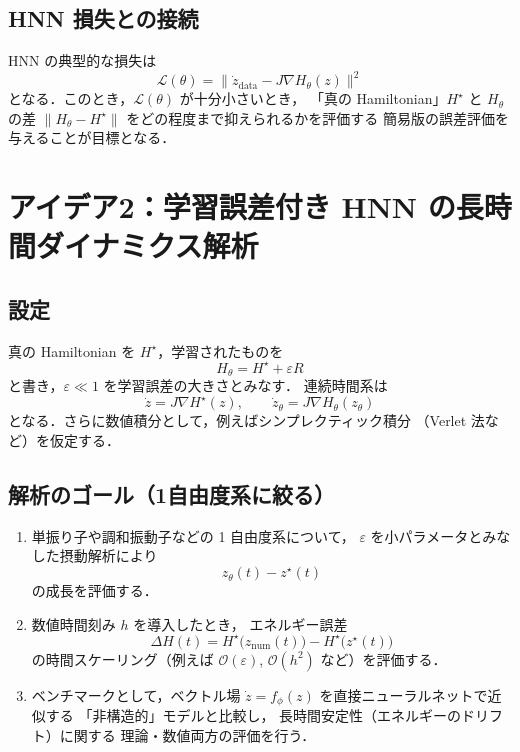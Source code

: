 \documentclass[a4paper,12pt]{jlreq}
\begin{document}
\subsection*{HNN 損失との接続}

HNN の典型的な損失は
\[
  \mathcal{L}(\theta)
  =
  \bigl\|
    \dot{z}_{\text{data}} - J \nabla H_\theta(z)
  \bigr\|^2
\]
となる．このとき，\(\mathcal{L}(\theta)\) が十分小さいとき，
「真の Hamiltonian」\(H^\star\) と \(H_\theta\) の差
\(\| H_\theta - H^\star\|\) をどの程度まで抑えられるかを評価する
簡易版の誤差評価を与えることが目標となる．

\bigskip

\section*{アイデア2：学習誤差付き HNN の長時間ダイナミクス解析}

\subsection*{設定}

真の Hamiltonian を \(H^\star\)，学習されたものを
\[
  H_\theta = H^\star + \varepsilon R
\]
と書き，\(\varepsilon \ll 1\) を学習誤差の大きさとみなす．
連続時間系は
\[
  \dot{z} = J \nabla H^\star(z),
  \qquad
  \dot{z}_\theta = J \nabla H_\theta(z_\theta)
\]
となる．さらに数値積分として，例えばシンプレクティック積分
（Verlet 法など）を仮定する．

\subsection*{解析のゴール（1自由度系に絞る）}

\begin{enumerate}
  \item 単振り子や調和振動子などの 1 自由度系について，
        \(\varepsilon\) を小パラメータとみなした摂動解析により
        \[
          z_\theta(t) - z^\star(t)
        \]
        の成長を評価する．
  \item 数値時間刻み \(h\) を導入したとき，
        エネルギー誤差
        \[
          \Delta H(t)
          =
          H^\star\bigl(z_{\text{num}}(t)\bigr)
          - H^\star\bigl(z^\star(t)\bigr)
        \]
        の時間スケーリング（例えば \(\mathcal{O}(\varepsilon)\),
        \(\mathcal{O}(h^2)\) など）を評価する．
  \item ベンチマークとして，ベクトル場
        \(\dot{z} = f_\phi(z)\) を直接ニューラルネットで近似する
        「非構造的」モデルと比較し，
        長時間安定性（エネルギーのドリフト）に関する
        理論・数値両方の評価を行う．
\end{enumerate}
\end{document}
